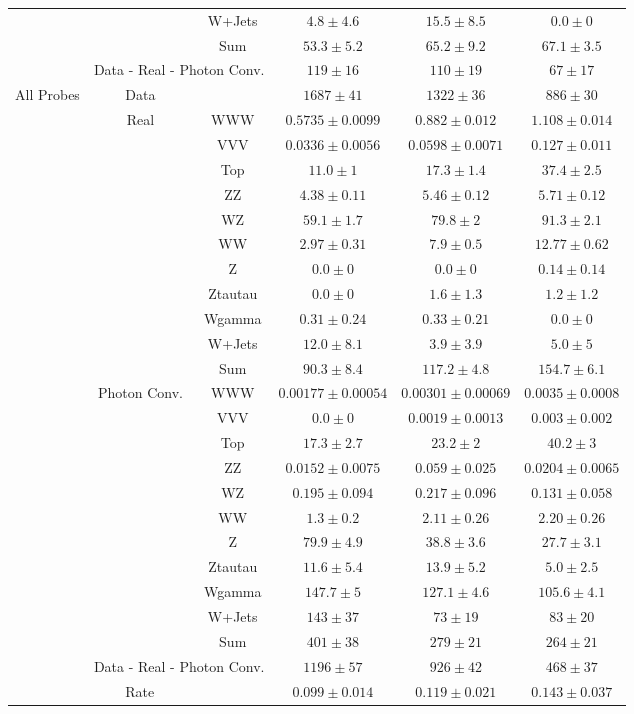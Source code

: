 \begin{tabular}{|c|cc||c|c|c|}
&& W+Jets &  $4.8 \pm 4.6$ &  $15.5 \pm 8.5$ &  $0.0 \pm 0$\\ 
\cline{3-6}
&& Sum &  $53.3 \pm 5.2$ &  $65.2 \pm 9.2$ &  $67.1 \pm 3.5$\\ 
\cline{2-6}
\cline{2-6}
&\multicolumn{2}{|c||}{Data - Real - Photon Conv.} &  $119 \pm 16$ &  $110 \pm 19$ &  $ 67 \pm 17$\\ 
\hline
\hline
\multirow{23}{*}{All Probes}&Data & &  $1687 \pm 41$ &  $1322 \pm 36$ &  $886 \pm 30$\\ 
\cline{2-6}
&\multirow{11}{*}{Real}& WWW &  $0.5735 \pm 0.0099$ &  $0.882 \pm 0.012$ &  $1.108 \pm 0.014$\\ 
&& VVV &  $0.0336 \pm 0.0056$ &  $0.0598 \pm 0.0071$ &  $0.127 \pm 0.011$\\ 
&& Top &  $11.0 \pm 1$ &  $17.3 \pm 1.4$ &  $37.4 \pm 2.5$\\ 
&& ZZ &  $4.38 \pm 0.11$ &  $5.46 \pm 0.12$ &  $5.71 \pm 0.12$\\ 
&& WZ &  $59.1 \pm 1.7$ &  $79.8 \pm 2$ &  $91.3 \pm 2.1$\\ 
&& WW &  $2.97 \pm 0.31$ &  $7.9 \pm 0.5$ &  $12.77 \pm 0.62$\\ 
&& Z &  $0.0 \pm 0$ &  $0.0 \pm 0$ &  $0.14 \pm 0.14$\\ 
&& Ztautau &  $0.0 \pm 0$ &  $1.6 \pm 1.3$ &  $1.2 \pm 1.2$\\ 
&& Wgamma &  $0.31 \pm 0.24$ &  $0.33 \pm 0.21$ &  $0.0 \pm 0$\\ 
&& W+Jets &  $12.0 \pm 8.1$ &  $3.9 \pm 3.9$ &  $5.0 \pm 5$\\ 
\cline{3-6}
&& Sum &  $90.3 \pm 8.4$ &  $117.2 \pm 4.8$ &  $154.7 \pm 6.1$\\ 
\cline{2-6}
\cline{2-6}
&\multirow{11}{*}{Photon Conv.}& WWW &  $0.00177 \pm 0.00054$ &  $0.00301 \pm 0.00069$ &  $0.0035 \pm 0.0008$\\ 
&& VVV &  $0.0 \pm 0$ &  $0.0019 \pm 0.0013$ &  $0.003 \pm 0.002$\\ 
&& Top &  $17.3 \pm 2.7$ &  $23.2 \pm 2$ &  $40.2 \pm 3$\\ 
&& ZZ &  $0.0152 \pm 0.0075$ &  $0.059 \pm 0.025$ &  $0.0204 \pm 0.0065$\\ 
&& WZ &  $0.195 \pm 0.094$ &  $0.217 \pm 0.096$ &  $0.131 \pm 0.058$\\ 
&& WW &  $1.3 \pm 0.2$ &  $2.11 \pm 0.26$ &  $2.20 \pm 0.26$\\ 
&& Z &  $79.9 \pm 4.9$ &  $38.8 \pm 3.6$ &  $27.7 \pm 3.1$\\ 
&& Ztautau &  $11.6 \pm 5.4$ &  $13.9 \pm 5.2$ &  $5.0 \pm 2.5$\\ 
&& Wgamma &  $147.7 \pm 5$ &  $127.1 \pm 4.6$ &  $105.6 \pm 4.1$\\ 
&& W+Jets &  $143 \pm 37$ &  $ 73 \pm 19$ &  $ 83 \pm 20$\\ 
\cline{3-6}
&& Sum &  $401 \pm 38$ &  $279 \pm 21$ &  $264 \pm 21$\\ 
\cline{2-6}
\cline{2-6}
&\multicolumn{2}{|c||}{Data - Real - Photon Conv.} &  $1196 \pm 57$ &  $926 \pm 42$ &  $468 \pm 37$\\ 
\hline
\hline
\multicolumn{3}{|c||}{Rate} &  $0.099 \pm 0.014$ &  $0.119 \pm 0.021$ &  $0.143 \pm 0.037$\\ 
\hline
\end{tabular}
